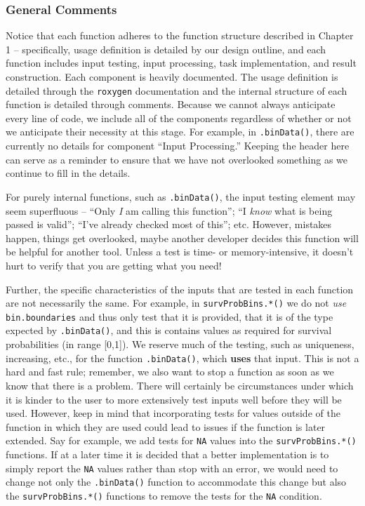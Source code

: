 \documentclass[
]{book}
\begin{document}
\hypertarget{general-comments}{%
\subsubsection{General Comments}\label{general-comments}}

Notice that each function adheres to the function structure described in Chapter 1 -- specifically, usage definition is detailed by our design outline, and each function includes input testing, input processing, task implementation, and result construction. Each component is heavily documented. The usage definition is detailed through the \texttt{roxygen} documentation and the internal structure of each function is detailed through comments. Because we cannot always anticipate every line of code, we include all of the components regardless of whether or not we anticipate their necessity at this stage. For example, in \texttt{.binData()}, there are currently no details for component ``Input Processing.'' Keeping the header here can serve as a reminder to ensure that we have not overlooked something as we continue to fill in the details.

For purely internal functions, such as \texttt{.binData()}, the input testing element may seem superfluous -- ``Only \emph{I} am calling this function''; ``I \emph{know} what is being passed is valid''; ``I've already checked most of this''; etc. However, mistakes happen, things get overlooked, maybe another developer decides this function will be helpful for another tool. Unless a test is time- or memory-intensive, it doesn't hurt to verify that you are getting what you need!

Further, the specific characteristics of the inputs that are tested in each function are not necessarily the same. For example, in \texttt{survProbBins.*()} we do not \emph{use} \texttt{bin.boundaries} and thus only test that it is provided, that it is of the type expected by \texttt{.binData()}, and this is contains values as required for survival probabilities (in range {[}0,1{]}). We reserve much of the testing, such as uniqueness, increasing, etc., for the function \texttt{.binData()}, which \textbf{uses} that input. This is not a hard and fast rule; remember, we also want to stop a function as soon as we know that there is a problem. There will certainly be circumstances under which it is kinder to the user to more extensively test inputs well before they will be used. However, keep in mind that incorporating tests for values outside of the function in which they are used could lead to issues if the function is later extended. Say for example, we add tests for \texttt{NA} values into the \texttt{survProbBins.*()} functions. If at a later time it is decided that a better implementation is to simply report the \texttt{NA} values rather than stop with an error, we would need to change not only the \texttt{.binData()} function to accommodate this change but also the \texttt{survProbBins.*()} functions to remove the tests for the \texttt{NA} condition.
\end{document}
